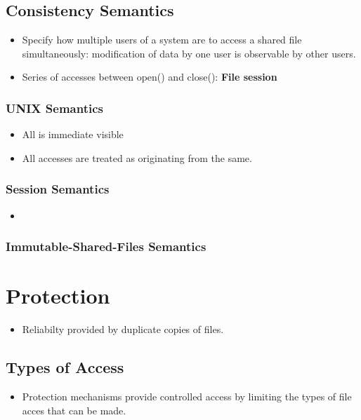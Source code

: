\documentclass[10pt]{report}
\begin{document}
		\subsection{Consistency Semantics}
			\begin{itemize}
					\item Specify how multiple users of a system are to access a shared file simultaneously: modification of data by one user is observable by other users.
					\item Series of accesses between open() and close(): \textbf{File session}
			\end{itemize}

			\subsubsection{UNIX Semantics}
				\begin{itemize}
						\item All is immediate visible
						\item All accesses are treated as originating from the same.
				\end{itemize}

			\subsubsection{Session Semantics}
				\begin{itemize}
						\item
				\end{itemize}

			\subsubsection{Immutable-Shared-Files Semantics}

	\section{Protection}
		\begin{itemize}
				\item Reliabilty provided by duplicate copies of files.
		\end{itemize}

		\subsection{Types of Access}
			\begin{itemize}
					\item Protection mechanisms provide controlled access by limiting the types of file acces that can be made.
			\end{itemize}
\end{document}
